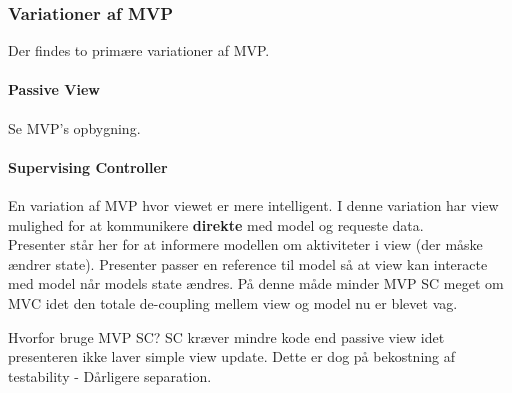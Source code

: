 \subsubsection{Variationer af MVP}
Der findes to primære variationer af MVP.

\paragraph{Passive View}
Se MVP's opbygning.

\paragraph{Supervising Controller}
En variation af MVP hvor viewet er mere intelligent. I denne variation har view mulighed for at kommunikere \textbf{direkte} med model og requeste data.\\

Presenter står her for at informere modellen om aktiviteter i view (der måske ændrer state). Presenter passer en reference til model så at view kan interacte med model når models state ændres. På denne måde minder MVP SC meget om MVC idet den totale de-coupling mellem view og model nu er blevet vag.

Hvorfor bruge MVP SC? SC kræver mindre kode end passive view idet presenteren ikke laver simple view update. Dette er dog på bekostning af testability - Dårligere separation.
